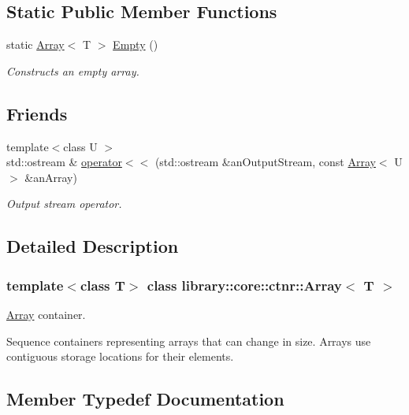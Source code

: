 \subsection*{Static Public Member Functions}
\begin{DoxyCompactItemize}
\item 
static \hyperlink{classlibrary_1_1core_1_1ctnr_1_1Array}{Array}$<$ T $>$ \hyperlink{classlibrary_1_1core_1_1ctnr_1_1Array_a7795ee997ae6008cd0bc8db607315524}{Empty} ()
\begin{DoxyCompactList}\small\item\em Constructs an empty array. \end{DoxyCompactList}\end{DoxyCompactItemize}
\subsection*{Friends}
\begin{DoxyCompactItemize}
\item 
{\footnotesize template$<$class U $>$ }\\std\+::ostream \& \hyperlink{classlibrary_1_1core_1_1ctnr_1_1Array_a9daa2d638e5bd693776f8bf6caae0802}{operator$<$$<$} (std\+::ostream \&an\+Output\+Stream, const \hyperlink{classlibrary_1_1core_1_1ctnr_1_1Array}{Array}$<$ U $>$ \&an\+Array)
\begin{DoxyCompactList}\small\item\em Output stream operator. \end{DoxyCompactList}\end{DoxyCompactItemize}


\subsection{Detailed Description}
\subsubsection*{template$<$class T$>$\newline
class library\+::core\+::ctnr\+::\+Array$<$ T $>$}

\hyperlink{classlibrary_1_1core_1_1ctnr_1_1Array}{Array} container. 

Sequence containers representing arrays that can change in size. Arrays use contiguous storage locations for their elements. 

\subsection{Member Typedef Documentation}
\mbox{\label{classlibrary_1_1core_1_1ctnr_1_1Array_ac26454f2a2ad4013873386a70aa25fc4}} 
